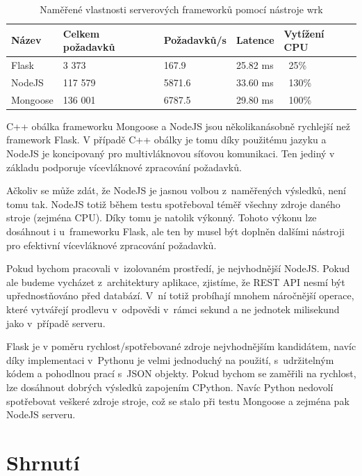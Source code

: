 \begin{table}[ht]
\centering
\caption{Naměřené vlastnosti serverových frameworků pomocí nástroje wrk}
\label{tab:server}
\begin{tabular}{|l|l|l|l|l|}
\hline
    Název       & Celkem požadavků  & Požadavků/s   & Latence   & Vytížení CPU\\ \hline
    Flask       & 3 373             & 167.9         & 25.82 ms  & ~25\%\\
    NodeJS      & 117 579           & 5871.6        & 33.60 ms  & ~130\%\\
    Mongoose    & 136 001           & 6787.5        & 29.80 ms  & ~100\%\\
   \hline
\end{tabular}
\end{table}

C++ obálka frameworku Mongoose a NodeJS jsou několikanásobně rychlejší než framework Flask. V případě C++ obálky je tomu díky použitému jazyku a NodeJS je koncipovaný pro multivláknovou síťovou komunikaci. Ten jediný v základu podporuje vícevláknové zpracování požadavků. 

Ačkoliv se může zdát, že NodeJS je jasnou volbou z~naměřených výsledků, není tomu tak. NodeJS totiž během testu spotřeboval téměř všechny zdroje daného stroje (zejména CPU). Díky tomu je natolik výkonný. Tohoto výkonu lze dosáhnout i u~frameworku Flask, ale ten by musel být doplněn dalšími nástroji pro efektivní vícevláknové zpracování požadavků.

Pokud bychom pracovali v~izolovaném prostředí, je nejvhodnější NodeJS. Pokud ale budeme vycházet z~architektury aplikace, zjistíme, že REST API nesmí být upřednostňováno před databází. V~ní totiž probíhají mnohem náročnější operace, které vytvářejí prodlevu v~odpovědi v~rámci sekund a ne jednotek milisekund jako v~případě serveru. 

Flask je v poměru rychlost/spotřebované zdroje nejvhodnějším kandidátem, navíc díky implementaci v~Pythonu je velmi jednoduchý na použití, s~udržitelným kódem a pohodlnou prací s~JSON objekty. Pokud bychom se zaměřili na rychlost, lze dosáhnout dobrých výsledků zapojením CPython. Navíc Python nedovolí spotřebovat veškeré zdroje stroje, což se stalo při testu Mongoose a zejména pak NodeJS serveru.

\section{Shrnutí}

